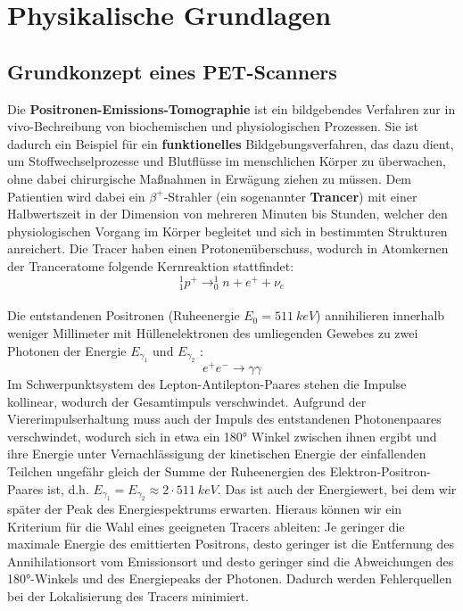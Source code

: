 \section{Physikalische Grundlagen}
\subsection{Grundkonzept eines PET-Scanners}
	Die \textbf{Positronen-Emissions-Tomographie} ist ein bildgebendes Verfahren zur in vivo-Bechreibung von biochemischen und physiologischen Prozessen. Sie ist dadurch ein Beispiel für ein \textbf{funktionelles} Bildgebungsverfahren, das dazu dient, um Stoffwechselprozesse und Blutflüsse im menschlichen Körper zu überwachen, ohne dabei chirurgische Maßnahmen in Erwägung ziehen zu müssen. Dem Patientien wird dabei ein $\beta^+$-Strahler (ein sogenannter \textbf{Trancer}) mit einer Halbwertszeit in der Dimension von mehreren Minuten bis Stunden, welcher den physiologischen Vorgang im Körper begleitet und sich in bestimmten Strukturen anreichert. Die Tracer haben einen Protonenüberschuss, wodurch in Atomkernen der Tranceratome folgende Kernreaktion stattfindet: 
	\begin{equation*}
	^1_1p^+ \longrightarrow ^1_0n + e^+ + \nu_e
	\end{equation*}\\
	Die entstandenen Positronen (Ruheenergie $E_0 = 511\ \unit{keV}$) annihilieren innerhalb weniger Millimeter mit Hüllenelektronen des umliegenden Gewebes zu zwei Photonen der Energie $E_{\gamma_1}$ und $E_{\gamma_2}$ :\\
	\begin{equation*}
		e^+ e^- \longrightarrow \gamma \gamma
	\end{equation*}
	Im Schwerpunktsystem des Lepton-Antilepton-Paares stehen die Impulse kollinear, wodurch der Gesamtimpuls verschwindet. Aufgrund der Viererimpulserhaltung muss auch der Impuls des entstandenen Photonenpaares verschwindet, wodurch sich in etwa ein 180° Winkel zwischen ihnen ergibt und ihre Energie unter Vernachlässigung der kinetischen Energie der einfallenden Teilchen ungefähr gleich der Summe der Ruheenergien des Elektron-Positron-Paares ist, d.h. $E_{\gamma_1} = E_{\gamma_2} \approx 2 \cdot 511\ \unit{keV}$. Das ist auch der Energiewert, bei dem wir später der Peak des Energiespektrums erwarten. Hieraus können wir ein Kriterium für die Wahl eines geeigneten Tracers ableiten: Je geringer die maximale Energie des emittierten Positrons, desto geringer ist die Entfernung des Annihilationsort vom Emissionsort und desto geringer sind die Abweichungen des 180°-Winkels und des Energiepeaks der Photonen. Dadurch werden Fehlerquellen bei der Lokalisierung des Tracers minimiert.\\
	
